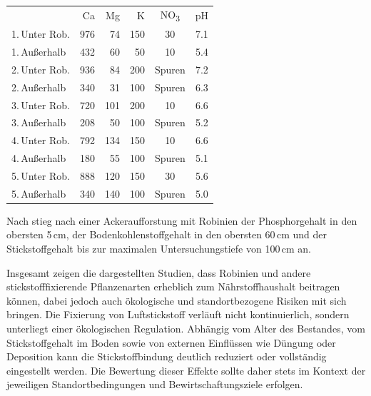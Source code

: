 \documentclass[twocolumn]{scrartcl}
\begin{document}
\begin{table}[htbp]
  \centering
  \begin{tabular}{lrrrcc}
           & Ca & Mg & K & NO\textsubscript{3} & pH \\
 1.\,Unter Rob. & 976 & 74  & 150  & 30   & 7.1 \\
 1.\,Außerhalb  & 432 & 60  &  50  & 10   & 5.4 \\[.3em]
 2.\,Unter Rob. & 936 & 84  & 200  & Spuren & 7.2 \\
 2.\,Außerhalb  & 340 & 31  & 100  & Spuren & 6.3 \\[.3em]
 3.\,Unter Rob. & 720 & 101 & 200  & 10   & 6.6 \\
 3.\,Außerhalb  & 208 & 50  & 100  & Spuren & 5.2 \\[.3em]
 4.\,Unter Rob. & 792 & 134 & 150  & 10   & 6.6 \\
 4.\,Außerhalb  & 180 & 55  & 100  & Spuren & 5.1 \\[.3em]
 5.\,Unter Rob. & 888 & 120 & 150  & 30   & 5.6 \\
 5.\,Außerhalb  & 340 & 140 & 100  & Spuren & 5.0 \\
  \end{tabular}
  \label{tab:naehrstoffeUnterRob}
\end{table}

Nach \citet{kou2016robinieBoden} stieg nach einer Ackeraufforstung mit Robinien der Phosphorgehalt in den obersten 5\,cm, der Bodenkohlenstoffgehalt in den obersten 60\,cm und der Stickstoffgehalt bis zur maximalen Untersuchungstiefe von 100\,cm an.

Insgesamt zeigen die dargestellten Studien, dass Robinien und andere stickstofffixierende Pflanzenarten erheblich zum Nährstoffhaushalt beitragen können, dabei jedoch auch ökologische und standortbezogene Risiken mit sich bringen. Die Fixierung von Luftstickstoff verläuft nicht kontinuierlich, sondern unterliegt einer ökologischen Regulation. Abhängig vom Alter des Bestandes, vom Stickstoffgehalt im Boden sowie von externen Einflüssen wie Düngung oder Deposition kann die Stickstoffbindung deutlich reduziert oder vollständig eingestellt werden. Die Bewertung dieser Effekte sollte daher stets im Kontext der jeweiligen Standortbedingungen und Bewirtschaftungsziele erfolgen.
\end{document}
